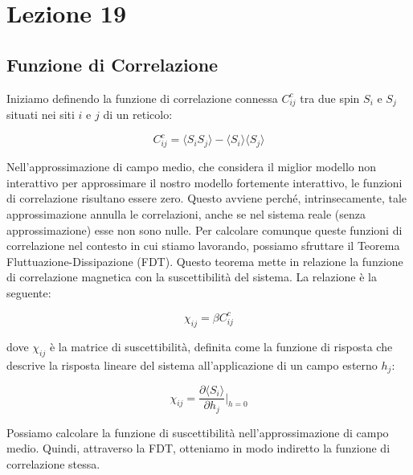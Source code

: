 \chapter{Lezione 19}
\label{capitolo_19}

\section{Funzione di Correlazione}
Iniziamo definendo la funzione di correlazione connessa $C_{ij}^c$ tra due spin $S_i$ e $S_j$ situati nei siti $i$ e $j$ di un reticolo:

\begin{equation} \label{eq:ch19_1}
C_{ij}^{c} = \langle S_i S_j \rangle - \langle S_i \rangle \langle S_j \rangle
\end{equation}

Nell'approssimazione di campo medio, che considera il miglior modello non interattivo per approssimare il nostro modello fortemente interattivo, le funzioni di correlazione risultano essere zero. Questo avviene perché, intrinsecamente, tale approssimazione annulla le correlazioni, anche se nel sistema reale (senza approssimazione) esse non sono nulle.
Per calcolare comunque queste funzioni di correlazione nel contesto in cui stiamo lavorando, possiamo sfruttare il Teorema Fluttuazione-Dissipazione (FDT). Questo teorema mette in relazione la funzione di correlazione magnetica con la suscettibilità del sistema. La relazione è la seguente:

\begin{equation} \label{eq:ch19_2}
\chi_{ij} = \beta C_{ij}^{c}
\end{equation}

dove $\chi_{ij}$ è la matrice di suscettibilità, definita come la funzione di risposta che descrive la risposta lineare del sistema all'applicazione di un campo esterno $h_j$:

\begin{equation} \label{eq:ch19_3}
\chi_{ij} = \frac{\partial \langle S_i \rangle}{\partial h_j} \bigg|_{h=0}
\end{equation}

Possiamo calcolare la funzione di suscettibilità nell'approssimazione di campo medio. Quindi, attraverso la FDT, otteniamo in modo indiretto la funzione di correlazione stessa.


